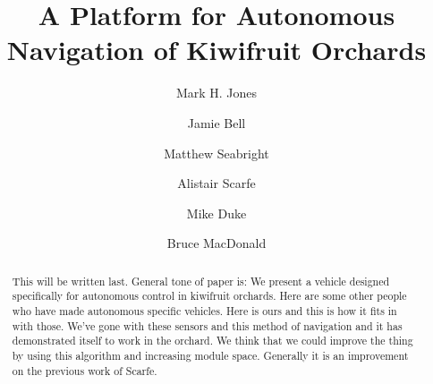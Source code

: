 \documentclass[preprint,authoryear,12pt]{elsarticle}
\begin{document}
\begin{frontmatter}



\title{A Platform for Autonomous Navigation of Kiwifruit Orchards}



\author[UoW]{Mark H. Jones} 

\author[UoA]{Jamie Bell}
\author[UoW]{Matthew Seabright}
\author[RPL]{Alistair Scarfe}
\author[UoW]{Mike Duke}
\author[UoA]{Bruce MacDonald}

\address[UoW]{School of Engineering, University of Waikato, Hamilton, New Zealand}
\address[UoA]{Faculty of Engineering, University of Auckland, Auckland, New Zealand}
\address[RPL]{Robotics Plus Ltd, Newnham Innovation Park, Tauranga, New Zealand}

\begin{abstract}

    This will be written last.
    General tone of paper is:
    We present a vehicle designed specifically for autonomous control in kiwifruit orchards.
    Here are some other people who have made autonomous specific vehicles.
    Here is ours and this is how it fits in with those.
    We've gone with these sensors and this method of navigation and it has demonstrated itself to work in the orchard.
    We think that we could improve the thing by using this algorithm and increasing module space.
    Generally it is an improvement on the previous work of Scarfe.
\end{abstract}


\end{frontmatter}
\end{document}
